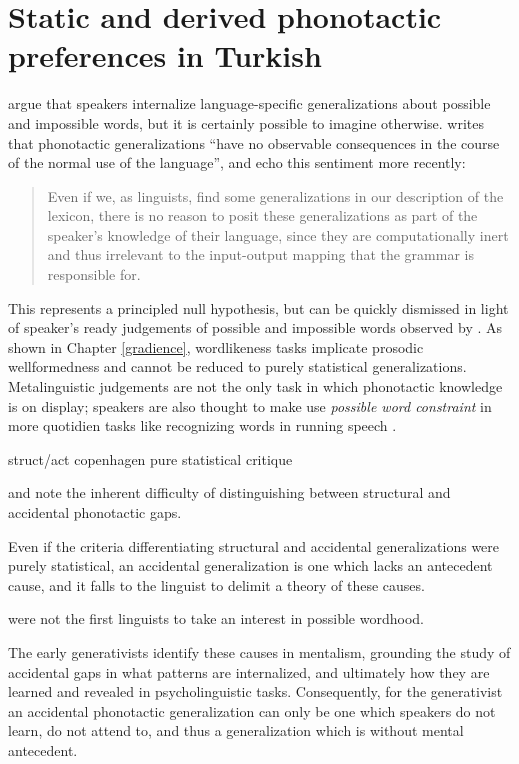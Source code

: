 \chapter{Static and derived phonotactic preferences in Turkish}
\label{turkish}

\citet{Chomsky1965} argue that speakers internalize language-specific generalizations about possible and impossible words, but it is certainly possible to imagine otherwise. \citet[][320]{Zimmer1969} writes that phonotactic generalizations ``have no observable consequences in the course of the normal use of the language'', and \citeauthor{PE} echo this sentiment more recently:

\begin{quote}
Even if we, as linguists, find some generalizations in our description of the lexicon, there is no reason to posit these generalizations as part of the speaker's knowledge of their language, since they are computationally inert and thus irrelevant to the input-output mapping that the grammar is responsible for. \citep[][18]{PE}
\end{quote}

This represents a principled null hypothesis, but can be quickly dismissed in light of speaker's ready judgements of possible and impossible words observed by \citeauthor{Chomsky1965}. As shown in Chapter \ref{gradience}, wordlikeness tasks implicate prosodic wellformedness and cannot be reduced to purely statistical generalizations. Metalinguistic judgements are not the only task in which phonotactic knowledge is on display; speakers are also thought to make use \emph{possible word constraint} in more quotidien tasks like recognizing words in running speech \citep[e.g.,][]{Brown1956,McQueen1998b,Norris1997}.


struct/act
copenhagen
pure statistical critique

\citet{Fischer-Jorgensen1952} and \citet{Vogt1954}
note the inherent difficulty of distinguishing between structural and accidental phonotactic gaps.

Even if the criteria differentiating structural and accidental generalizations were purely statistical, an accidental generalization is one which lacks an antecedent cause, and it falls to the linguist to delimit a theory of these causes. 

\citeauthor{Chomsky1965} were not the first linguists to take an interest in possible wordhood. 

The early generativists identify these causes in mentalism, grounding the study of accidental gaps in what patterns are internalized, and ultimately how they are learned and revealed in psycholinguistic tasks. Consequently, for the generativist an accidental phonotactic generalization can only be one which speakers do not learn, do not attend to, and thus a generalization which is without mental antecedent.

